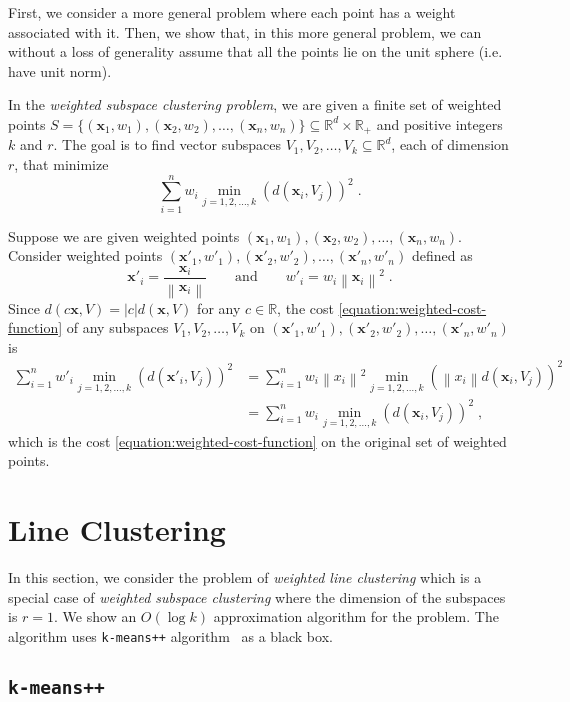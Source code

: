 \documentclass[12pt]{article}
\newcommand{\R}{\mathbb{R}}
\newcommand{\norm}[1]{\left\|#1\right\|}
\newcommand{\x}{\mathbf{x}}
\begin{document}
First, we consider a more general problem where each point has a weight
associated with it. Then, we show that, in this more general problem, we can
without a loss of generality assume that all the points lie on the unit sphere
(i.e. have unit norm).

In the \emph{weighted subspace clustering problem},
we are given a finite set of weighted points $S = \{ (\x_1, w_1), (\x_2, w_2), \dots, (\x_n, w_n) \} \subseteq \R^d \times \R_+$
and positive integers $k$ and $r$. The goal is to find vector subspaces $V_1, V_2, \dots, V_k \subseteq \R^d$,
each of dimension $r$, that minimize
\begin{equation}
\label{equation:weighted-cost-function}
\sum_{i=1}^n w_i \min_{j=1,2,\dots,k} \left(d(\x_i, V_j)\right)^2 \; .
\end{equation}

Suppose we are given weighted points $(\x_1, w_1), (\x_2, w_2), \dots, (\x_n, w_n)$.
Consider weighted points $(\x'_1, w'_1), (\x'_2, w'_2), \dots, (\x'_n, w'_n)$
defined as
$$
\x'_i = \frac{\x_i}{\norm{\x_i}} \qquad \text{and} \qquad
w'_i = w_i \norm{\x_i}^2 \; .
$$
Since $d(c \x, V) = |c| d(\x,V)$ for any $c \in \R$,
the cost \eqref{equation:weighted-cost-function} of any subspaces
$V_1, V_2, \dots, V_k$ on $(\x'_1, w'_1), (\x'_2, w'_2), \dots, (\x'_n, w'_n)$ is
\begin{align*}
\sum_{i=1}^n w'_i \min_{j=1,2,\dots,k} \left(d(\x'_i, V_j)\right)^2
& = \sum_{i=1}^n w_i \norm{x_i}^2 \min_{j=1,2,\dots,k} \left( \norm{x_i} d(\x_i, V_j) \right)^2 \\
& = \sum_{i=1}^n w_i \min_{j=1,2,\dots,k} \left( d(\x_i, V_j) \right)^2 \; ,
\end{align*}
which is the cost \eqref{equation:weighted-cost-function}
on the original set of weighted points.

\section{Line Clustering}
\label{section:line-clustering}

In this section, we consider the problem of \emph{weighted line clustering}
which is a special case of \emph{weighted subspace
clustering} where the dimension of the subspaces is $r=1$.
We show an $O(\log k)$ approximation algorithm for the problem.
The algorithm uses \texttt{k-means++} algorithm~\cite{Arthur-Vassilvitskii-2007} as a black box.

\subsection{\texttt{k-means++}}
\end{document}
